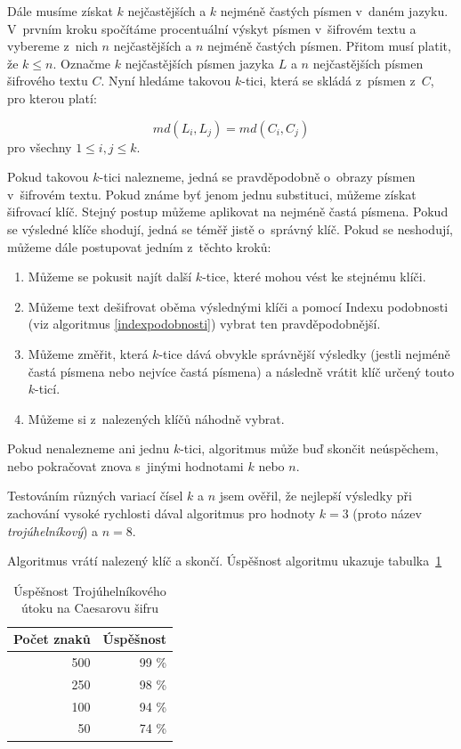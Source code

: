 \documentclass[12pt]{article}
\theoremstyle{definition}
\begin{document}
Dále musíme získat $k$ nejčastějších a $k$ nejméně častých písmen v~daném jazyku. V~prvním kroku spočítáme procentuální výskyt písmen v~šifrovém textu a vybereme z~nich $n$ nejčastějších a $n$ nejméně častých písmen. Přitom musí platit, že $k\le n$. Označme $k$ nejčastějších písmen jazyka $L$ a $n$ nejčastějších písmen šifrového textu $C$. Nyní hledáme takovou $k$-tici, která se skládá z~písmen z~$C$, pro kterou platí: 

$$md(L_i, L_j) = md(C_i, C_j)$$
pro všechny $1\le i,j\le k$.

Pokud takovou $k$-tici nalezneme, jedná se pravděpodobně o~obrazy písmen v~šifrovém textu. Pokud známe byť jenom jednu substituci, můžeme získat šifrovací klíč. Stejný postup můžeme aplikovat na nejméně častá písmena. Pokud se výsledné klíče shodují, jedná se téměř jistě o~správný klíč. Pokud se neshodují, můžeme dále postupovat jedním z~těchto kroků:

\begin{enumerate}
\item Můžeme se pokusit najít další $k$-tice, které mohou vést ke stejnému klíči.
\item Můžeme text dešifrovat oběma výslednými klíči a pomocí Indexu podobnosti (viz algoritmus \ref{indexpodobnosti}) vybrat ten pravděpodobnější.
\item Můžeme změřit, která $k$-tice dává obvykle správnější výsledky (jestli nejméně častá písmena nebo nejvíce častá písmena) a následně vrátit klíč určený touto $k$-ticí. 
\item Můžeme si z~nalezených klíčů náhodně vybrat.
\end{enumerate}

Pokud nenalezneme ani jednu $k$-tici, algoritmus může buď skončit neúspěchem, nebo pokračovat znova s~jinými hodnotami $k$ nebo $n$.

Testováním různých variací čísel $k$ a $n$ jsem ověřil, že nejlepší výsledky při zachování vysoké rychlosti dával algoritmus pro hodnoty $k=3$ (proto název {\em trojúhelníkový}) a $n=8$. 

Algoritmus vrátí nalezený klíč a skončí. Úspěšnost algoritmu ukazuje tabulka~\ref{tabtriangle}

\begin{table}[ht]
  \begin{center}
    \begin{tabular}{|r|r|}
    \hline
    Počet znaků&Úspěšnost\\
    \hline
    500&99 \%\\
    250&98 \%\\
    100&94 \%\\
    50&74 \%\\
    \hline
    \end{tabular}
    \caption{Úspěšnost Trojúhelníkového útoku na Caesarovu šifru}
    \label{tabtriangle} 
  \end{center}
\end{table}
\end{document}
